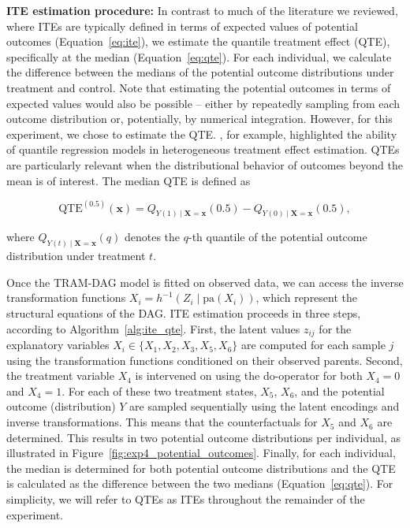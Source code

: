 \textbf{ITE estimation procedure:} \label{qte:exp4} In contrast to much of the literature we reviewed, where ITEs are typically defined in terms of expected values of potential outcomes (Equation~\ref{eq:ite}), we estimate the quantile treatment effect (QTE), specifically at the median (Equation~\ref{eq:qte}). For each individual, we calculate the difference between the medians of the potential outcome distributions under treatment and control. Note that estimating the potential outcomes in terms of expected values would also be possible -- either by repeatedly sampling from each outcome distribution or, potentially, by numerical integration. However, for this experiment, we chose to estimate the QTE. 
\citet{chernozhukov2005}, for example, highlighted the ability of quantile regression models in heterogeneous treatment effect estimation. QTEs are particularly relevant when the distributional behavior of outcomes beyond the mean is of interest. The median QTE is defined as

\begin{equation}
\text{QTE}^{(0.5)}(\mathbf{x}) = Q_{Y(1) \mid \mathbf{X} = \mathbf{x}}(0.5) - Q_{Y(0) \mid \mathbf{X} = \mathbf{x}}(0.5),
\label{eq:qte}
\end{equation}


where $Q_{Y(t) \mid \mathbf{X} = \mathbf{x}}(q)$ denotes the $q$-th quantile of the potential outcome distribution under treatment $t$.

Once the TRAM-DAG model is fitted on observed data, we can access the inverse transformation functions $X_i = h^{-1}(Z_i \mid \text{pa}(X_i))$, which represent the structural equations of the DAG. ITE estimation proceeds in three steps, according to Algorithm~\ref{alg:ite_qte}. First, the latent values $z_{ij}$ for the explanatory variables $X_i \in \{X_1, X_2, X_3, X_5, X_6\}$ are computed for each sample $j$ using the transformation functions conditioned on their observed parents. Second, the treatment variable $X_4$ is intervened on using the do-operator for both $X_4 = 0$ and $X_4 = 1$. For each of these two treatment states, $X_5$, $X_6$, and the potential outcome (distribution) $Y$ are sampled sequentially using the latent encodings and inverse transformations. This means that the counterfactuals for $X_5$ and $X_6$ are determined. This results in two potential outcome distributions per individual, as illustrated in Figure~\ref{fig:exp4_potential_outcomes}. Finally, for each individual, the median is determined for both potential outcome distributions and the QTE is calculated as the difference between the two medians (Equation~\ref{eq:qte}). 
For simplicity, we will refer to QTEs as ITEs throughout the remainder of the experiment.


